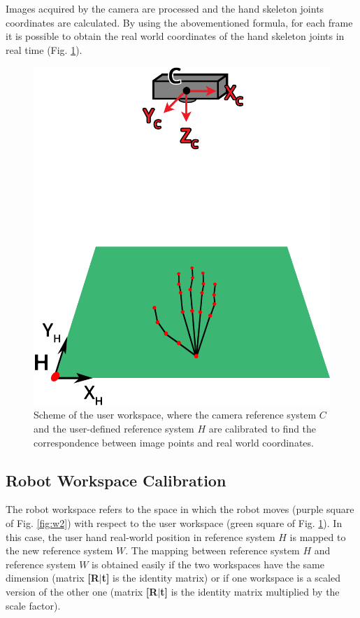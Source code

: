 \documentclass[letterpaper, 10 pt, conference]{ieeeconf}  %
\begin{document}
Images acquired by the camera are processed and the hand skeleton joints coordinates are calculated. By using the abovementioned formula, for each frame it is possible to obtain the real world coordinates of the hand skeleton joints in real time (Fig. \ref{fig:w1}).

\begin{figure} [h!]
  \centering
  \includegraphics[width=0.5\columnwidth]{figures/w1.png}
  \caption{Scheme of the user workspace, where the camera reference system $C$ and the user-defined reference system $H$ are calibrated to find the correspondence between image points and real world coordinates.}
  \label{fig:w1}
\end{figure}


\subsection{Robot Workspace Calibration}
The robot workspace refers to the space in which the robot moves (purple square of Fig. \ref{fig:w2}) with respect to the user workspace (green square of Fig. \ref{fig:w1}). In this case, the user hand real-world position in reference system $H$ is mapped to the new reference system $W$. The mapping between reference system $H$ and reference system $W$ is obtained easily if the two workspaces have the same dimension (matrix \textbf{[R$|$t]} is the identity matrix) or if one workspace is a scaled version of the other one (matrix \textbf{[R$|$t]} is the identity matrix multiplied by the scale factor). %
\end{document}
